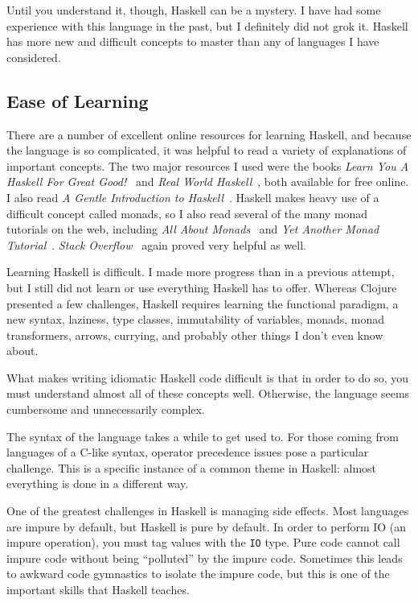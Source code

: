 \documentclass{article}
\begin{document}
Until you understand it, though, Haskell can be a mystery.  I have had some
experience with this language in the past, but I definitely did not grok it.
Haskell has more new and difficult concepts to master than any of languages I
have considered.

\subsection{Ease of Learning}

There are a number of excellent online resources for learning Haskell, and
because the language is so complicated, it was helpful to read a variety of
explanations of important concepts.  The two major resources I used were the
books \emph{Learn You A Haskell For Great Good!}~\cite{learnyouahaskell} and
\emph{Real World Haskell}~\cite{realworldhaskell}, both available for free
online.  I also read \emph{A Gentle Introduction to
Haskell}~\cite{gentleintroduction}.  Haskell makes heavy use of a difficult
concept called monads, so I also read several of the many monad tutorials on the
web, including \emph{All About Monads}~\cite{allaboutmonads} and \emph{Yet
Another Monad Tutorial}~\cite{yamt}.  \emph{Stack Overflow}~\cite{stackoverflow}
again proved very helpful as well.

Learning Haskell is difficult.  I made more progress than in a previous attempt,
but I still did not learn or use everything Haskell has to offer.  Whereas
Clojure presented a few challenges, Haskell requires learning the functional
paradigm, a new syntax, laziness, type classes, immutability of variables,
monads, monad transformers, arrows, currying, and probably other things I don't
even know about.

What makes writing idiomatic Haskell code difficult is that in order to do so,
you must understand almost all of these concepts well.  Otherwise, the
language seems cumbersome and unnecessarily complex.

The syntax of the language takes a while to get used to.  For those coming from
languages of a C-like syntax, operator precedence issues pose a particular
challenge.  This is a specific instance of a common theme in Haskell: almost
everything is done in a different way.

One of the greatest challenges in Haskell is managing side effects.  Most
languages are impure by default, but Haskell is pure by default.  In order to
perform IO (an impure operation), you must tag values with the \texttt{IO} type.
Pure code cannot call impure code without being ``polluted'' by the impure code.
Sometimes this leads to awkward code gymnastics to isolate the impure code, but
this is one of the important skills that Haskell teaches.
\end{document}
